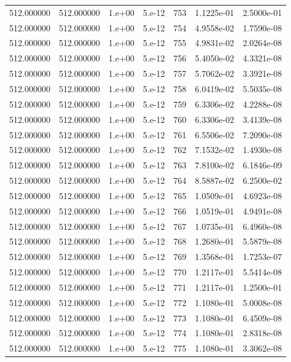 \begin{table}[htbp]
\begin{tabular}{rrrrrrr}
512.000000 & 512.000000 & 1.e+00 & 5.e-12 & 753 & 1.1225e-01 & 2.5000e-01 \\
512.000000 & 512.000000 & 1.e+00 & 5.e-12 & 754 & 4.9558e-02 & 1.7590e-08 \\
512.000000 & 512.000000 & 1.e+00 & 5.e-12 & 755 & 4.9831e-02 & 2.0264e-08 \\
512.000000 & 512.000000 & 1.e+00 & 5.e-12 & 756 & 5.4050e-02 & 4.3321e-08 \\
512.000000 & 512.000000 & 1.e+00 & 5.e-12 & 757 & 5.7062e-02 & 3.3921e-08 \\
512.000000 & 512.000000 & 1.e+00 & 5.e-12 & 758 & 6.0419e-02 & 5.5035e-08 \\
512.000000 & 512.000000 & 1.e+00 & 5.e-12 & 759 & 6.3306e-02 & 4.2288e-08 \\
512.000000 & 512.000000 & 1.e+00 & 5.e-12 & 760 & 6.3306e-02 & 3.4139e-08 \\
512.000000 & 512.000000 & 1.e+00 & 5.e-12 & 761 & 6.5506e-02 & 7.2090e-08 \\
512.000000 & 512.000000 & 1.e+00 & 5.e-12 & 762 & 7.1532e-02 & 1.4930e-08 \\
512.000000 & 512.000000 & 1.e+00 & 5.e-12 & 763 & 7.8100e-02 & 6.1846e-09 \\
512.000000 & 512.000000 & 1.e+00 & 5.e-12 & 764 & 8.5887e-02 & 6.2500e-02 \\
512.000000 & 512.000000 & 1.e+00 & 5.e-12 & 765 & 1.0509e-01 & 4.6923e-08 \\
512.000000 & 512.000000 & 1.e+00 & 5.e-12 & 766 & 1.0519e-01 & 4.9491e-08 \\
512.000000 & 512.000000 & 1.e+00 & 5.e-12 & 767 & 1.0735e-01 & 6.4960e-08 \\
512.000000 & 512.000000 & 1.e+00 & 5.e-12 & 768 & 1.2680e-01 & 5.5879e-08 \\
512.000000 & 512.000000 & 1.e+00 & 5.e-12 & 769 & 1.3568e-01 & 1.7253e-07 \\
512.000000 & 512.000000 & 1.e+00 & 5.e-12 & 770 & 1.2117e-01 & 5.5414e-08 \\
512.000000 & 512.000000 & 1.e+00 & 5.e-12 & 771 & 1.2117e-01 & 1.2500e-01 \\
512.000000 & 512.000000 & 1.e+00 & 5.e-12 & 772 & 1.1080e-01 & 5.0008e-08 \\
512.000000 & 512.000000 & 1.e+00 & 5.e-12 & 773 & 1.1080e-01 & 6.4509e-08 \\
512.000000 & 512.000000 & 1.e+00 & 5.e-12 & 774 & 1.1080e-01 & 2.8318e-08 \\
512.000000 & 512.000000 & 1.e+00 & 5.e-12 & 775 & 1.1080e-01 & 3.3062e-08 \\

\end{tabular}
\end{table}
